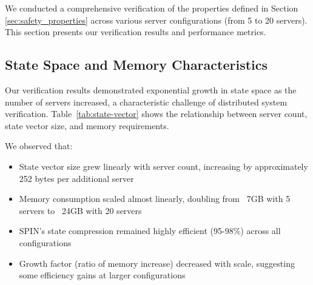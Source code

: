 We conducted a comprehensive verification of the properties defined in Section \ref{sec:safety_properties} across various server configurations (from 5 to 20 servers). This section presents our verification results and performance metrics.

\subsection{State Space and Memory Characteristics}
\label{sec:state_space}

Our verification results demonstrated exponential growth in state space as the number of servers increased, a characteristic challenge of distributed system verification. Table~\ref{tab:state-vector} shows the relationship between server count, state vector size, and memory requirements.

\begin{table}[!htbp]
\centering
\caption{State Vector Size and Memory Characteristics by Server Count}
\label{tab:state-vector}
\end{table}

We observed that:
\begin{itemize}
    \item State vector size grew linearly with server count, increasing by approximately 252 bytes per additional server
    \item Memory consumption scaled almost linearly, doubling from ~7GB with 5 servers to ~24GB with 20 servers
    \item SPIN's state compression remained highly efficient (95-98\%) across all configurations
    \item Growth factor (ratio of memory increase) decreased with scale, suggesting some efficiency gains at larger configurations
\end{itemize}

